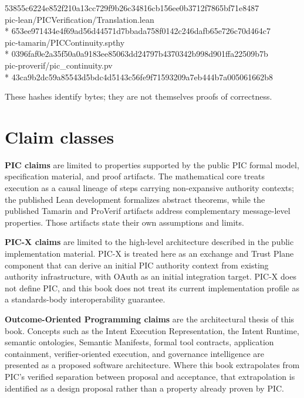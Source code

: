 \documentclass[10pt,oneside,openany]{book}
\begin{document}
{\hspace*{1.2em}53855c6224e852f210a13cc729f9b26c34816cb156ee0b3712f7865bf71e8487\\
pic-lean/PICVerification/Translation.lean\\*
\hspace*{1.2em}653ee971434e4f69ad56d44571d7bbada758f0142c246dafb65e726c70d464c7\\
pic-tamarin/PICContinuity.spthy\\*
\hspace*{1.2em}0396faf0e2a35f50a0a9183ee85063dd24797b4370342b998d901ffa22509b7b\\
pic-proverif/pic\_continuity.pv\\*
\hspace*{1.2em}43ca9b2dc59a85543d5bdc4d5143c56fe9f71593209a7eb444b7a005061662b8\par}
These hashes identify bytes; they are not themselves proofs of correctness.

\section{Claim classes}
\textbf{PIC claims} are limited to properties supported by the public PIC formal model, specification material, and proof artifacts. The mathematical core treats execution as a causal lineage of steps carrying non-expansive authority contexts; the published Lean development formalizes abstract theorems, while the published Tamarin and ProVerif artifacts address complementary message-level properties. Those artifacts state their own assumptions and limits.

\textbf{PIC-X claims} are limited to the high-level architecture described in the public implementation material. PIC-X is treated here as an exchange and Trust Plane component that can derive an initial PIC authority context from existing authority infrastructure, with OAuth as an initial integration target. PIC-X does not define PIC, and this book does not treat its current implementation profile as a standards-body interoperability guarantee.

\textbf{Outcome-Oriented Programming claims} are the architectural thesis of this book. Concepts such as the Intent Execution Representation, the Intent Runtime, semantic ontologies, Semantic Manifests, formal tool contracts, application containment, verifier-oriented execution, and governance intelligence are presented as a proposed software architecture. Where this book extrapolates from PIC's verified separation between proposal and acceptance, that extrapolation is identified as a design proposal rather than a property already proven by PIC.
\end{document}
